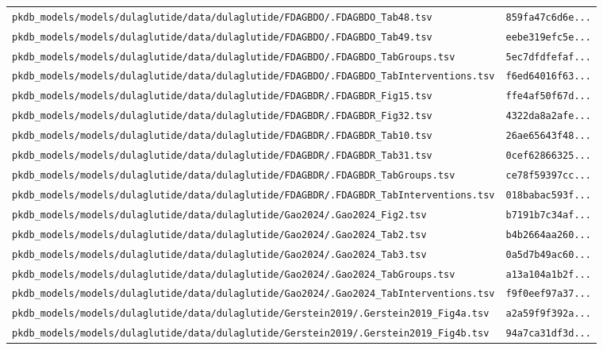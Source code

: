 \documentclass{article}
\begin{document}
\begin{longtable}{ll}
\texttt{pkdb\_models/models/dulaglutide/data/dulaglutide/FDAGBDO/.FDAGBDO\_Tab48.tsv} & \texttt{859fa47c6d6e...} \\
\texttt{pkdb\_models/models/dulaglutide/data/dulaglutide/FDAGBDO/.FDAGBDO\_Tab49.tsv} & \texttt{eebe319efc5e...} \\
\texttt{pkdb\_models/models/dulaglutide/data/dulaglutide/FDAGBDO/.FDAGBDO\_TabGroups.tsv} & \texttt{5ec7dfdfefaf...} \\
\texttt{pkdb\_models/models/dulaglutide/data/dulaglutide/FDAGBDO/.FDAGBDO\_TabInterventions.tsv} & \texttt{f6ed64016f63...} \\
\texttt{pkdb\_models/models/dulaglutide/data/dulaglutide/FDAGBDR/.FDAGBDR\_Fig15.tsv} & \texttt{ffe4af50f67d...} \\
\texttt{pkdb\_models/models/dulaglutide/data/dulaglutide/FDAGBDR/.FDAGBDR\_Fig32.tsv} & \texttt{4322da8a2afe...} \\
\texttt{pkdb\_models/models/dulaglutide/data/dulaglutide/FDAGBDR/.FDAGBDR\_Tab10.tsv} & \texttt{26ae65643f48...} \\
\texttt{pkdb\_models/models/dulaglutide/data/dulaglutide/FDAGBDR/.FDAGBDR\_Tab31.tsv} & \texttt{0cef62866325...} \\
\texttt{pkdb\_models/models/dulaglutide/data/dulaglutide/FDAGBDR/.FDAGBDR\_TabGroups.tsv} & \texttt{ce78f59397cc...} \\
\texttt{pkdb\_models/models/dulaglutide/data/dulaglutide/FDAGBDR/.FDAGBDR\_TabInterventions.tsv} & \texttt{018babac593f...} \\
\texttt{pkdb\_models/models/dulaglutide/data/dulaglutide/Gao2024/.Gao2024\_Fig2.tsv} & \texttt{b7191b7c34af...} \\
\texttt{pkdb\_models/models/dulaglutide/data/dulaglutide/Gao2024/.Gao2024\_Tab2.tsv} & \texttt{b4b2664aa260...} \\
\texttt{pkdb\_models/models/dulaglutide/data/dulaglutide/Gao2024/.Gao2024\_Tab3.tsv} & \texttt{0a5d7b49ac60...} \\
\texttt{pkdb\_models/models/dulaglutide/data/dulaglutide/Gao2024/.Gao2024\_TabGroups.tsv} & \texttt{a13a104a1b2f...} \\
\texttt{pkdb\_models/models/dulaglutide/data/dulaglutide/Gao2024/.Gao2024\_TabInterventions.tsv} & \texttt{f9f0eef97a37...} \\
\texttt{pkdb\_models/models/dulaglutide/data/dulaglutide/Gerstein2019/.Gerstein2019\_Fig4a.tsv} & \texttt{a2a59f9f392a...} \\
\texttt{pkdb\_models/models/dulaglutide/data/dulaglutide/Gerstein2019/.Gerstein2019\_Fig4b.tsv} & \texttt{94a7ca31df3d...} \\

\end{longtable}
\end{document}

